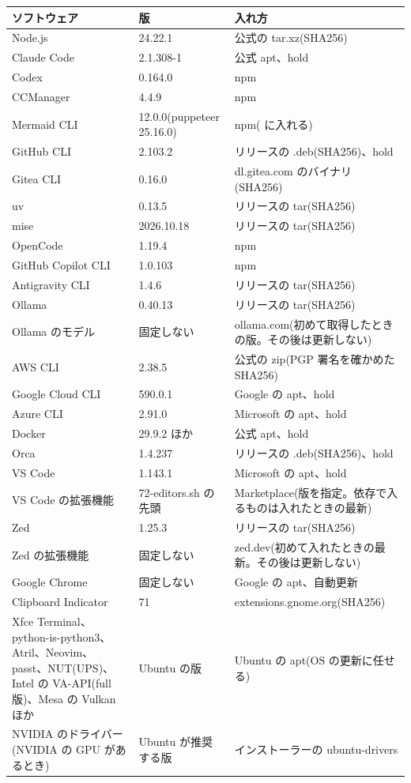 \documentclass[a4paper,10pt]{ltjsarticle}
\newcommand{\code}[1]{\texttt{\detokenize{#1}}}
\newcommand{\headrow}{\rowcolor{accentlight}}
\begin{document}
{\small
\begin{longtable}{P{0.32}P{0.28}P{0.40}}
\toprule\headrow
ソフトウェア & 版 & 入れ方 \\
\midrule
\endhead
Node.js & 24.22.1 & 公式の tar.xz(SHA256) \\
Claude Code & 2.1.308-1 & 公式 apt、hold \\
Codex & 0.164.0 & npm \\
CCManager & 4.4.9 & npm \\
Mermaid CLI & 12.0.0(puppeteer 25.16.0) & npm(\code{/opt} に入れる) \\
GitHub CLI & 2.103.2 & リリースの .deb(SHA256)、hold \\
Gitea CLI & 0.16.0 & dl.gitea.com のバイナリ(SHA256) \\
uv & 0.13.5 & リリースの tar(SHA256) \\
mise & 2026.10.18 & リリースの tar(SHA256) \\
OpenCode & 1.19.4 & npm \\
GitHub Copilot CLI & 1.0.103 & npm \\
Antigravity CLI & 1.4.6 & リリースの tar(SHA256) \\
Ollama & 0.40.13 & リリースの tar(SHA256) \\
Ollama のモデル & 固定しない & ollama.com(初めて取得したときの版。その後は更新しない) \\
AWS CLI & 2.38.5 & 公式の zip(PGP 署名を確かめた SHA256) \\
Google Cloud CLI & 590.0.1 & Google の apt、hold \\
Azure CLI & 2.91.0 & Microsoft の apt、hold \\
Docker & 29.9.2 ほか & 公式 apt、hold \\
Orca & 1.4.237 & リリースの .deb(SHA256)、hold \\
VS Code & 1.143.1 & Microsoft の apt、hold \\
VS Code の拡張機能 & 72-editors.sh の先頭 & Marketplace(版を指定。依存で入るものは入れたときの最新) \\
Zed & 1.25.3 & リリースの tar(SHA256) \\
Zed の拡張機能 & 固定しない & zed.dev(初めて入れたときの最新。その後は更新しない) \\
Google Chrome & 固定しない & Google の apt、自動更新 \\
Clipboard Indicator & 71 & extensions.gnome.org(SHA256) \\
Xfce Terminal、python-is-python3、Atril、Neovim、passt、NUT(UPS)、Intel の VA-API(full 版)、Mesa の Vulkan ほか & Ubuntu の版 & Ubuntu の apt(OS の更新に任せる) \\
NVIDIA のドライバー(NVIDIA の GPU があるとき) & Ubuntu が推奨する版 & インストーラーの ubuntu-drivers \\
\bottomrule
\end{longtable}}
\end{document}
